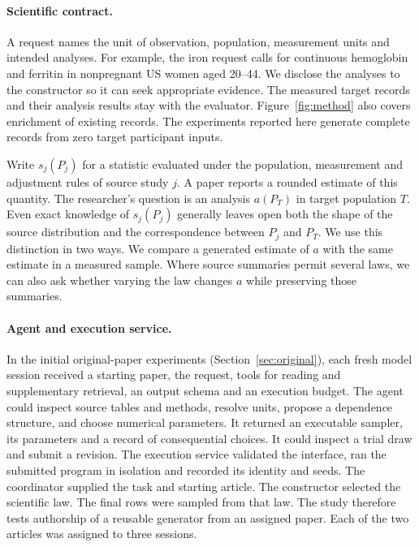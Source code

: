 \documentclass[sigconf,anonymous,review]{acmart}
\begin{document}
\paragraph{Scientific contract.}
A request names the unit of observation, population, measurement units and intended analyses. For example, the iron request calls for continuous hemoglobin and ferritin in nonpregnant US women aged 20--44. We disclose the analyses to the constructor so it can seek appropriate evidence. The measured target records and their analysis results stay with the evaluator. Figure~\ref{fig:method} also covers enrichment of existing records. The experiments reported here generate complete records from zero target participant inputs.

Write $s_j(P_j)$ for a statistic evaluated under the population, measurement and adjustment rules of source study $j$. A paper reports a rounded estimate of this quantity. The researcher's question is an analysis $a(P_T)$ in target population $T$. Even exact knowledge of $s_j(P_j)$ generally leaves open both the shape of the source distribution and the correspondence between $P_j$ and $P_T$. We use this distinction in two ways. We compare a generated estimate of $a$ with the same estimate in a measured sample. Where source summaries permit several laws, we can also ask whether varying the law changes $a$ while preserving those summaries.

\paragraph{Agent and execution service.}
In the initial original-paper experiments (Section~\ref{sec:original}), each fresh model session received a starting paper, the request, tools for reading and supplementary retrieval, an output schema and an execution budget. The agent could inspect source tables and methods, resolve units, propose a dependence structure, and choose numerical parameters. It returned an executable sampler, its parameters and a record of consequential choices. It could inspect a trial draw and submit a revision. The execution service validated the interface, ran the submitted program in isolation and recorded its identity and seeds. The coordinator supplied the task and starting article. The constructor selected the scientific law. The final rows were sampled from that law. The study therefore tests authorship of a reusable generator from an assigned paper. Each of the two articles was assigned to three sessions.
\end{document}
